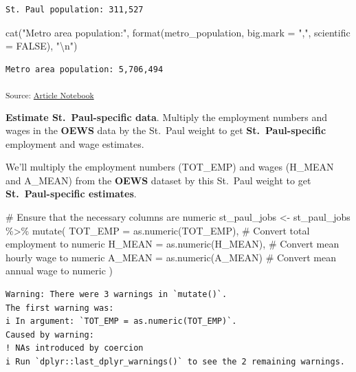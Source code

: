 \documentclass[
  letterpaper,
  DIV=11,
  numbers=noendperiod]{scrartcl}
\newenvironment{Shaded}{\begin{snugshade}}{\end{snugshade}}
\newcommand{\AttributeTok}[1]{\textcolor[rgb]{0.40,0.45,0.13}{#1}}
\newcommand{\CommentTok}[1]{\textcolor[rgb]{0.37,0.37,0.37}{#1}}
\newcommand{\ConstantTok}[1]{\textcolor[rgb]{0.56,0.35,0.01}{#1}}
\newcommand{\FunctionTok}[1]{\textcolor[rgb]{0.28,0.35,0.67}{#1}}
\newcommand{\NormalTok}[1]{\textcolor[rgb]{0.00,0.23,0.31}{#1}}
\newcommand{\OtherTok}[1]{\textcolor[rgb]{0.00,0.23,0.31}{#1}}
\newcommand{\SpecialCharTok}[1]{\textcolor[rgb]{0.37,0.37,0.37}{#1}}
\newcommand{\StringTok}[1]{\textcolor[rgb]{0.13,0.47,0.30}{#1}}
\begin{document}
\begin{verbatim}
St. Paul population: 311,527 
\end{verbatim}

\begin{Shaded}
\begin{Highlighting}[]
\FunctionTok{cat}\NormalTok{(}\StringTok{"Metro area population:"}\NormalTok{, }\FunctionTok{format}\NormalTok{(metro\_population, }\AttributeTok{big.mark =} \StringTok{","}\NormalTok{, }\AttributeTok{scientific =} \ConstantTok{FALSE}\NormalTok{), }\StringTok{"}\SpecialCharTok{\textbackslash{}n}\StringTok{"}\NormalTok{)}
\end{Highlighting}
\end{Shaded}

\begin{verbatim}
Metro area population: 5,706,494 
\end{verbatim}

\textsubscript{Source:
\href{https://beeckcenter.github.io/climate-equity-workforce/index-preview.html}{Article
Notebook}}

\textbf{Estimate St.~Paul-specific data}. Multiply the employment
numbers and wages in the \textbf{OEWS} data by the St.~Paul weight to
get \textbf{St.~Paul-specific} employment and wage estimates.

We'll multiply the employment numbers (TOT\_EMP) and wages (H\_MEAN and
A\_MEAN) from the \textbf{OEWS} dataset by this St.~Paul weight to get
\textbf{St.~Paul-specific estimates}.

\begin{Shaded}
\begin{Highlighting}[]
\CommentTok{\# Ensure that the necessary columns are numeric}
\NormalTok{st\_paul\_jobs }\OtherTok{\textless{}{-}}\NormalTok{ st\_paul\_jobs }\SpecialCharTok{\%\textgreater{}\%}
  \FunctionTok{mutate}\NormalTok{(}
    \AttributeTok{TOT\_EMP =} \FunctionTok{as.numeric}\NormalTok{(TOT\_EMP),  }\CommentTok{\# Convert total employment to numeric}
    \AttributeTok{H\_MEAN =} \FunctionTok{as.numeric}\NormalTok{(H\_MEAN),    }\CommentTok{\# Convert mean hourly wage to numeric}
    \AttributeTok{A\_MEAN =} \FunctionTok{as.numeric}\NormalTok{(A\_MEAN)     }\CommentTok{\# Convert mean annual wage to numeric}
\NormalTok{  )}
\end{Highlighting}
\end{Shaded}

\begin{verbatim}
Warning: There were 3 warnings in `mutate()`.
The first warning was:
i In argument: `TOT_EMP = as.numeric(TOT_EMP)`.
Caused by warning:
! NAs introduced by coercion
i Run `dplyr::last_dplyr_warnings()` to see the 2 remaining warnings.
\end{verbatim}
\end{document}
